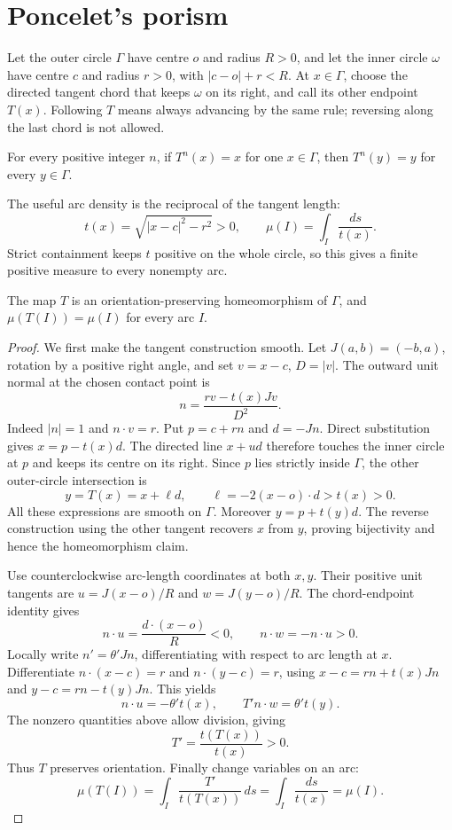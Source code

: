 \section{Poncelet's porism}

Let the outer circle $\Gamma$ have centre $o$ and radius $R>0$, and let the inner circle $\omega$ have centre $c$ and radius $r>0$, with $|c-o|+r<R$. At $x\in\Gamma$, choose the directed tangent chord that keeps $\omega$ on its right, and call its other endpoint $T(x)$. Following $T$ means always advancing by the same rule; reversing along the last chord is not allowed.

\begin{theorem}\label{geometry:thm:poncelet}
For every positive integer $n$, if $T^n(x)=x$ for one $x\in\Gamma$, then $T^n(y)=y$ for every $y\in\Gamma$.
\end{theorem}

The useful arc density is the reciprocal of the tangent length:
\[
t(x)=\sqrt{|x-c|^2-r^2}>0,\qquad
\mu(I)=\int_I\frac{ds}{t(x)}.
\]
Strict containment keeps $t$ positive on the whole circle, so this gives a finite positive measure to every nonempty arc.

\begin{lemma}\label{geometry:lem:poncelet}
The map $T$ is an orientation-preserving homeomorphism of $\Gamma$, and $\mu(T(I))=\mu(I)$ for every arc $I$.
\end{lemma}
\begin{proof}
We first make the tangent construction smooth. Let $J(a,b)=(-b,a)$, rotation by a positive right angle, and set $v=x-c$, $D=|v|$. The outward unit normal at the chosen contact point is
\[
n=\frac{rv-t(x)Jv}{D^2}.
\]
Indeed $|n|=1$ and $n\cdot v=r$. Put $p=c+rn$ and $d=-Jn$. Direct substitution gives $x=p-t(x)d$. The directed line $x+ud$ therefore touches the inner circle at $p$ and keeps its centre on its right. Since $p$ lies strictly inside $\Gamma$, the other outer-circle intersection is
\[
y=T(x)=x+\ell d,\qquad \ell=-2(x-o)\cdot d>t(x)>0.
\]
All these expressions are smooth on $\Gamma$. Moreover $y=p+t(y)d$. The reverse construction using the other tangent recovers $x$ from $y$, proving bijectivity and hence the homeomorphism claim.

Use counterclockwise arc-length coordinates at both $x,y$. Their positive unit tangents are $u=J(x-o)/R$ and $w=J(y-o)/R$. The chord-endpoint identity gives
\[
n\cdot u=\frac{d\cdot(x-o)}R<0,\qquad
n\cdot w=-n\cdot u>0.
\]
Locally write $n'=\theta'Jn$, differentiating with respect to arc length at $x$. Differentiate $n\cdot(x-c)=r$ and $n\cdot(y-c)=r$, using $x-c=rn+t(x)Jn$ and $y-c=rn-t(y)Jn$. This yields
\[
n\cdot u=-\theta't(x),\qquad
T' n\cdot w=\theta't(y).
\]
The nonzero quantities above allow division, giving
\[
T'=\frac{t(T(x))}{t(x)}>0.
\]
Thus $T$ preserves orientation. Finally change variables on an arc:
\[
\mu(T(I))=\int_I\frac{T'}{t(T(x))}\,ds
=\int_I\frac{ds}{t(x)}=\mu(I).
\]
\end{proof}

